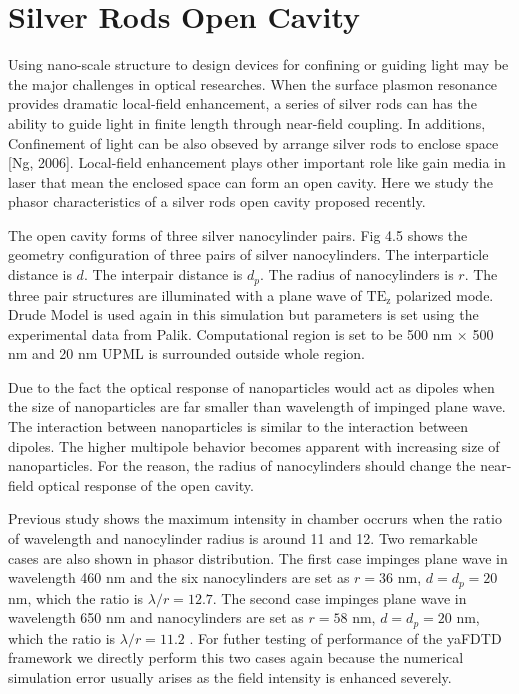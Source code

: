 \section{Silver Rods Open Cavity}
Using nano-scale structure to design devices for confining or guiding light may be the major challenges in optical
researches. When the surface plasmon resonance provides dramatic local-field enhancement, a series of silver rods can
has the ability to guide light in finite length through near-field coupling. In additions, Confinement of light can be
also obseved by arrange silver rods to enclose space [Ng, 2006]. Local-field enhancement plays other important role like
gain media in laser that mean the enclosed space can form an open cavity. Here we study the phasor characteristics of a
silver rods open cavity proposed recently.

The open cavity forms of three silver nanocylinder pairs. Fig 4.5 shows the geometry configuration of three pairs of
silver nanocylinders. The interparticle distance is $d$. The interpair distance is $d_p$. The radius of nanocylinders is
$r$. The three pair structures are illuminated with a plane wave of $\mathrm{TE_z}$ polarized mode. Drude Model is used
again in this simulation but parameters is set using the experimental data from Palik. Computational region is set to be
500 nm $\times$ 500 nm and 20 nm UPML is surrounded outside whole region.

Due to the fact the optical response of nanoparticles would act as dipoles when the size of nanoparticles are far
smaller than wavelength of impinged plane wave. The interaction between nanoparticles is similar to the interaction
between dipoles. The higher multipole behavior becomes apparent with increasing size of nanoparticles. For the reason,
the radius of nanocylinders should change the near-field optical response of the open cavity.

Previous study shows the maximum intensity in chamber occrurs when the ratio of wavelength and nanocylinder radius is
around 11 and 12. Two remarkable cases are also shown in phasor distribution. The first case impinges plane wave in
wavelength 460 nm and the six nanocylinders are set as $r = 36$ nm, $d = d_p = 20$ nm, which the ratio is $\lambda /r
= 12.7$. The second case impinges plane wave in wavelength 650 nm and nanocylinders are set as $r = 58$ nm, $d = d_p =
20$ nm, which the ratio is $\lambda /r = 11.2$ . For futher testing of performance of the yaFDTD framework we directly
perform this two cases again because the numerical simulation error usually arises as the field intensity is enhanced
severely.


